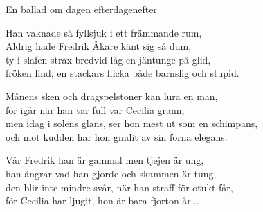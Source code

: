 \begin{song}{En ballad om dagen efter}{dagenefter}
\begin{vers}
Han vaknade så fyllsjuk i ett främmande rum,\\
Aldrig hade Fredrik Åkare känt sig så dum,\\
ty i slafen strax bredvid låg en jäntunge på glid,\\
fröken lind, en stackars flicka både barnslig och stupid.\\
\end{vers}
\begin{vers}
Månens sken och dragspelstoner kan lura en man,\\
för igår när han var full var Cecilia grann,\\
men idag i solens glans, ser hon mest ut som en schimpans,\\
och mot kudden har hon gnidit av sin forna elegans.\\
\end{vers}
\begin{vers}
Vår Fredrik han är gammal men tjejen är ung,\\
han ångrar vad han gjorde och skammen är tung,\\
den blir inte mindre svår, när han straff för otukt får,\\
för Cecilia har ljugit, hon är bara fjorton år...\\
\end{vers}
\end{song}
